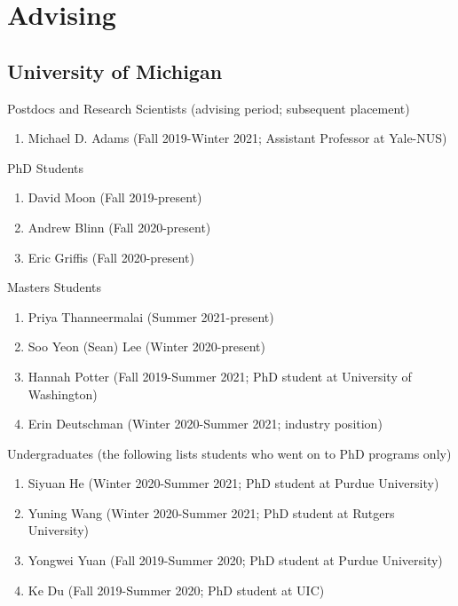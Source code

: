 \documentclass[10pt,letterpaper]{article}
\renewenvironment{itemize}{
  \begin{list}{}{
    \setlength{\leftmargin}{1.25em}
    \setlength{\itemsep}{0.25em}
    \setlength{\parskip}{0pt}
    \setlength{\parsep}{0.2em}
  }
}{
  \end{list}
}
\begin{document}
\section*{Advising}

\subsection*{University of Michigan}
\begin{itemize}
\item Postdocs and Research Scientists (advising period; subsequent placement)
  \begin{enumerate}
    \item Michael D. Adams (Fall 2019-Winter 2021; Assistant Professor at Yale-NUS)
  \end{enumerate}
\item PhD Students
  \begin{enumerate}
    \item David Moon (Fall 2019-present)
    \item Andrew Blinn (Fall 2020-present)
    \item Eric Griffis (Fall 2020-present)
  \end{enumerate}
\item Masters Students
  \begin{enumerate}
    \item Priya Thanneermalai (Summer 2021-present)
    \item Soo Yeon (Sean) Lee (Winter 2020-present)
    \item Hannah Potter (Fall 2019-Summer 2021; PhD student at University of Washington)
    \item Erin Deutschman (Winter 2020-Summer 2021; industry position)
  \end{enumerate}
\item Undergraduates (the following lists students who went on to PhD programs only)
  \begin{enumerate}
    \item Siyuan He (Winter 2020-Summer 2021; PhD student at Purdue University)
    \item Yuning Wang (Winter 2020-Summer 2021; PhD student at Rutgers University)
    \item Yongwei Yuan (Fall 2019-Summer 2020; PhD student at Purdue University)
    \item Ke Du (Fall 2019-Summer 2020; PhD student at UIC)

\end{enumerate}
\end{itemize}
\end{document}
